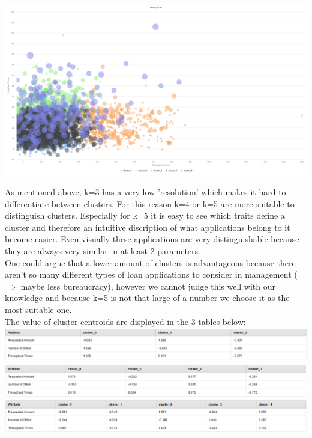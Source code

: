 \documentclass[../../main.tex]{subfiles}
\begin{document}
\includegraphics[width=\textwidth]{img/QUESTION_3a_kmeans_5_offers_amount.png}

As mentioned above, k=3 has a very low 'resolution' which makes it hard to differentiate between clusters. For this reason k=4 or k=5 are more suitable to distinguish clusters. Especially for k=5 it is easy to see which traits define a cluster and therefore an intuitive discription of what applications belong to it become easier. 
Even visually these applications are very distinguishable because they are always very similar in at least 2 parameters.\\
One could argue that a lower amount of clusters is advantageous because there aren't so many different types of loan applications to consider in management ($\Rightarrow$ maybe less bureaucracy), however we cannot judge this well with our knowledge and because k=5 is not that large of a number we choose it as the most suitable one.\\ 

The value of cluster centroids are displayed in the 3 tables below:\\
\includegraphics[width=\textwidth]{img/QUESTION_3a_kmeans_3_centroids.png}
\includegraphics[width=\textwidth]{img/QUESTION_3a_kmeans_4_centroids.png}
\includegraphics[width=\textwidth]{img/QUESTION_3a_kmeans_5_centroids.png}
\end{document}

